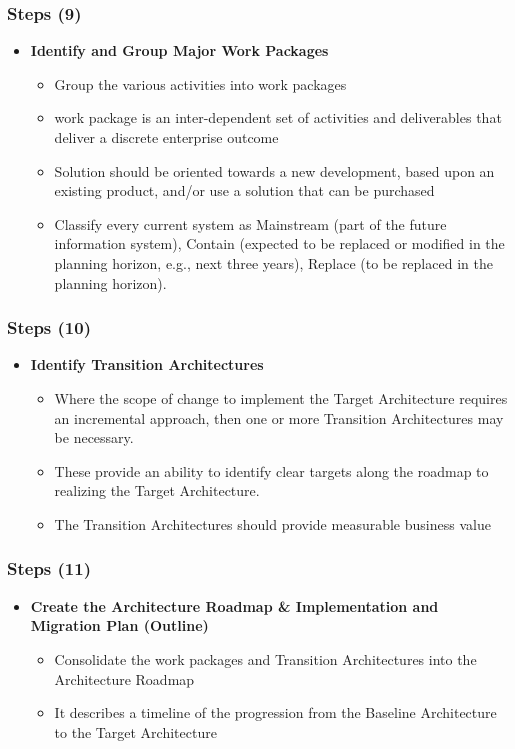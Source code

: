 \documentclass[aspectratio=169, table]{beamer}
\begin{document}
		\begin{frame}
		\frametitle{Steps (9)}
		\vspace{20pt}
		\begin{itemize}
			\item \textbf{Identify and Group Major Work Packages}
			\begin{itemize}
				\item Group the various activities into work packages 
				\item work package is an inter-dependent set of activities and deliverables that deliver a discrete
				enterprise outcome
				\item Solution should be oriented towards a new development, based upon an existing product, and/or
				use a solution that can be purchased
				\item Classify every current system as Mainstream (part of the future information system), Contain (expected to be replaced or modified in the planning horizon, e.g., next three years), Replace (to be replaced in the planning horizon).
			\end{itemize}
		\end{itemize}
	\end{frame}

	\begin{frame}
		\frametitle{Steps (10)}
		\vspace{20pt}
		\begin{itemize}
			\item \textbf{Identify Transition Architectures}
			\begin{itemize}
				\item Where the scope of change to implement the Target Architecture requires an incremental approach, then one or more Transition
				Architectures may be necessary. 
				\item These provide an ability to identify clear
				targets along the roadmap to realizing the Target Architecture. 
				\item The Transition Architectures should provide measurable business value
			\end{itemize}
		\end{itemize}
	\end{frame}

		\begin{frame}
		\frametitle{Steps (11)}
		\vspace{20pt}
		\begin{itemize}
			\item \textbf{Create the Architecture Roadmap \& Implementation and Migration Plan (Outline)}
			\begin{itemize}
				\item Consolidate the work packages and Transition Architectures into the
				Architecture Roadmap
				\item It describes a timeline of the
				progression from the Baseline Architecture to the Target Architecture
			\end{itemize}
		\end{itemize}
	\end{frame}
	
\end{document}
